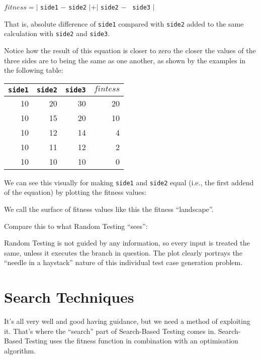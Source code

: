 \begin{center}
$\mathit{fitness} = |$ {\tt side1} $-$ {\tt side2} $| + |$ {\tt side2} $-$ {\tt
side3} $|$
\end{center}

That is, absolute difference of {\tt side1} compared with {\tt side2} added to
the same calculation with {\tt side2} and {\tt side3}.

Notice how the result of this equation is closer to zero the closer the values
of the three sides are to being the same as one another, as shown by the
examples in the following table:

\begin{center}
    \begin{tabular}{rrrr}
        \toprule 
        {\tt side1} & {\tt side2} & {\tt side3} & $\mathit{fintess}$ \\
        \midrule
        10 & 20 & 30 & 20 \\
        10 & 15 & 20 & 10 \\
        10 & 12 & 14 & 4  \\
        10 & 11 & 12 & 2  \\
        10 & 10 & 10 & 0  \\
        \bottomrule
    \end{tabular}
\end{center}

We can see this visually for making {\tt side1} and {\tt side2} equal (i.e., the
first addend of the equation) by plotting the fitness values:

We call the surface of fitness values like this the fitness ``landscape''. 

Compare this to what Random Testing ``sees'':

Random Testing is not guided by any information, so every input is treated the
same, unless it executes the branch in question. The plot clearly portrays the
``needle in a haystack'' nature of this individual test case generation problem.

\section{Search Techniques}

It's all very well and good having guidance, but we need a method of exploiting
it. That's where the ``search'' part of Search-Based Testing comes in.
Search-Based Testing uses the fitness function in combination with an
optimisation algorithm. 

